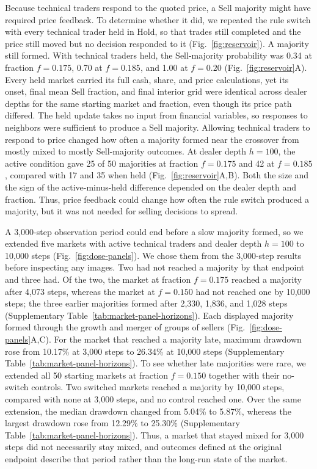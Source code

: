 Because technical traders respond to the quoted price, a Sell majority
might have required price feedback. To determine whether it did, we
repeated the rule switch with every technical trader held in Hold, so
that trades still completed and the price still moved but no decision
responded to it (Fig.~\ref{fig:reservoir}). A majority still formed.
With technical traders held, the Sell-majority probability was
0.34 at fraction $f=0.175$, 0.70 at $f=0.185$, and
1.00 at $f=0.20$ (Fig.~\ref{fig:reservoir}A). Every held market carried
its full cash, share, and price calculations, yet its onset, final mean
Sell fraction, and final interior grid were identical across dealer
depths for the same starting market and fraction, even though its price
path differed. The held update takes no input from financial variables,
so responses to neighbors were sufficient to produce a Sell majority.
Allowing technical traders to respond to price changed how often a
majority formed near the crossover from mostly mixed to mostly
Sell-majority outcomes. At dealer depth $h=100$, the active condition
gave 25 of 50 majorities at fraction $f=0.175$ and 42 at $f=0.185$,
compared with 17 and 35 when held (Fig.~\ref{fig:reservoir}A,B).
Both the size and the sign of the active-minus-held difference depended
on the dealer depth and fraction. Thus, price feedback could change how
often the rule switch produced a majority, but it was not needed for
selling decisions to spread.



A 3,000-step observation period could end before a slow majority formed,
so we extended five markets with active technical traders and dealer
depth $h=100$ to 10,000 steps (Fig.~\ref{fig:dose-panels}). We chose them from the
3,000-step results before inspecting any images. Two had not reached a
majority by that endpoint and three had. Of the two, the market at
fraction $f=0.175$ reached a majority after 4{,}073 steps, whereas the
market at $f=0.150$ had not reached one by 10,000 steps; the three
earlier majorities formed after 2{,}330, 1{,}836, and
1{,}028 steps (Supplementary Table~\ref{tab:market-panel-horizons}). Each
displayed majority formed through the growth and merger of groups of
sellers (Fig.~\ref{fig:dose-panels}A,C). For the market that reached a majority late,
maximum drawdown rose from 10.17\% at 3,000 steps to 26.34\% at
10,000 steps (Supplementary Table~\ref{tab:market-panel-horizons}). To see whether late
majorities were rare, we extended all 50 starting markets at fraction
$f=0.150$ together with their no-switch controls. Two switched markets
reached a majority by 10,000 steps, compared with none at 3,000 steps,
and no control reached one. Over the same extension, the median
drawdown changed from 5.04\% to 5.87\%, whereas the largest
drawdown rose from 12.29\% to 25.30\%
(Supplementary Table~\ref{tab:market-panel-horizons}). Thus, a market that stayed mixed
for 3,000 steps did not necessarily stay mixed, and outcomes defined at
the original endpoint describe that period rather than the long-run
state of the market.

